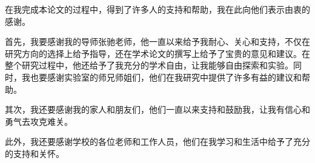 
\begin{acknowledgements}

在我完成本论文的过程中，得到了许多人的支持和帮助，我在此向他们表示由衷的感谢。

首先，我要感谢我的导师张驰老师，他一直以来给予我耐心、关心和支持，不仅在研究方向的选择上给予指导，还在学术论文的撰写上给予了宝贵的意见和建议。在整个研究过程中，他还给予了我充分的学术自由，让我能够自由探索和实验。同时，我也要感谢实验室的师兄师姐们，他们在我研究中提供了许多有益的建议和帮助。

其次，我还要感谢我的家人和朋友们，他们一直以来支持和鼓励我，让我有信心和勇气去攻克难关。

此外，我还要感谢学校的各位老师和工作人员，他们在我学习和生活中给予了充分的支持和关怀。

\end{acknowledgements}
